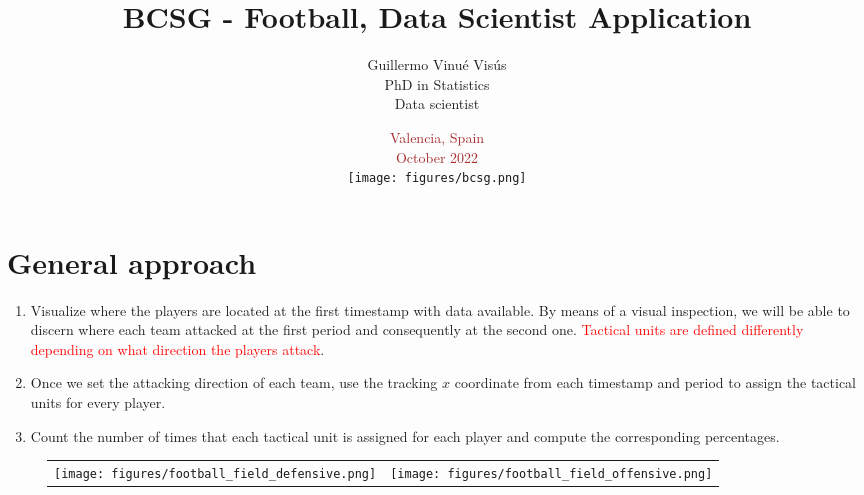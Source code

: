 \documentclass{beamer}
\title{BCSG - Football, Data Scientist Application}
\author[BCSG - Football, Data Scientist Application]{Guillermo Vinu\'e Vis\'us \\ PhD in Statistics \\ Data scientist}
\institute[Guillermo Vinu\'e Vis\'us, PhD]{}
\date{\textcolor{brown}{{Valencia, Spain \\ October 2022}} \\
\vspace{0.2cm}
\hspace*{0.2cm}\texttt{[image: figures/bcsg.png]}
}
\begin{document}
\begin{frame}[plain]
\titlepage
\end{frame}

\section{General approach}
\begin{frame}{}
\begin{enumerate}
\scriptsize
\item Visualize where the players are located at the first timestamp with data available. By means of a visual inspection, we will be able to discern where each team attacked at the first period and consequently at the second one. \textcolor{red}{Tactical units are defined differently depending on what direction the players attack}.

\vspace*{0.25cm}

\item Once we set the attacking direction of each team, use the tracking $x$ coordinate from each timestamp and period to assign the tactical units for every player.

\vspace*{0.35cm}

\item Count the number of times that each tactical unit is assigned for each player and compute the corresponding percentages.
\end{enumerate}

\begin{figure}[H]
\centering
\begin{tabular}{cc}
\hspace*{-0.2cm}\texttt{[image: figures/football\_field\_defensive.png]}&
\texttt{[image: figures/football\_field\_offensive.png]}\\
\end{tabular}
\end{figure}
\end{frame}
\end{document}
